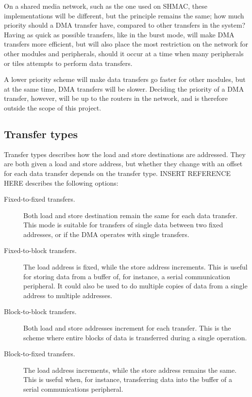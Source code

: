 On a shared media network, such as the one used on SHMAC, these implementations will be different,
but the principle remains the same; how much priority should a DMA transfer have, compared to other transfers in the system?
Having as quick as possible transfers, like in the burst mode, will make DMA transfers more efficient, but will also place the most restriction on the network for other modules and peripherals, should it occur at a time when many peripherals or tiles attempts to perform data transfers.

A lower priority scheme will make data transfers go faster for other modules, but at the same time, DMA transfers will be slower.
Deciding the priority of a DMA transfer, however, will be up to the routers in the network, and is therefore outside the scope of this project.

\subsection{Transfer types}
Transfer types describes how the load and store destinations are addressed.
They are both given a load and store address, but whether they change with an offset for each data transfer depends on the transfer type.
INSERT REFERENCE HERE describes the following options:
\begin{description}
    \item[Fixed-to-fixed transfers.]
    Both load and store destination remain the same for each data transfer.
    This mode is suitable for transfers of single data between two fixed addresses, or if the DMA operates with single transfers.
    \item[Fixed-to-block transfers.]
    The load address is fixed, while the store address increments.
    This is useful for storing data from a buffer of, for instance, a serial communication peripheral.
    It could also be used to do multiple copies of data from a single address to multiple addresses.
    \item[Block-to-block transfers.]
    Both load and store addresses increment for each transfer.
    This is the scheme where entire blocks of data is transferred during a single operation.
    \item[Block-to-fixed transfers.]
    The load address increments, while the store address remains the same.
    This is useful when, for instance, transferring data into the buffer of a serial communications peripheral.
\end{description}

